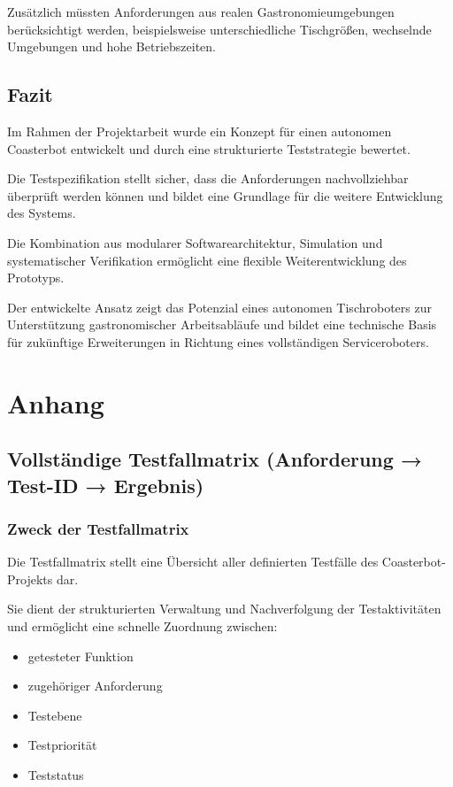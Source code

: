 Zusätzlich müssten Anforderungen aus realen Gastronomieumgebungen
berücksichtigt werden, beispielsweise unterschiedliche Tischgrößen,
wechselnde Umgebungen und hohe Betriebszeiten.

\subsection{Fazit}\label{fazit}

Im Rahmen der Projektarbeit wurde ein Konzept für einen autonomen
Coasterbot entwickelt und durch eine strukturierte Teststrategie
bewertet.

Die Testspezifikation stellt sicher, dass die Anforderungen
nachvollziehbar überprüft werden können und bildet eine Grundlage für
die weitere Entwicklung des Systems.

Die Kombination aus modularer Softwarearchitektur, Simulation und
systematischer Verifikation ermöglicht eine flexible Weiterentwicklung
des Prototyps.

Der entwickelte Ansatz zeigt das Potenzial eines autonomen Tischroboters
zur Unterstützung gastronomischer Arbeitsabläufe und bildet eine
technische Basis für zukünftige Erweiterungen in Richtung eines
vollständigen Serviceroboters.

\section{Anhang}\label{anhang}

\subsection{Vollständige Testfallmatrix (Anforderung → Test-ID →
Ergebnis)}\label{vollstuxe4ndige-testfallmatrix-anforderung-test-id-ergebnis}

\subsubsection{Zweck der Testfallmatrix}\label{zweck-der-testfallmatrix}

Die Testfallmatrix stellt eine Übersicht aller definierten Testfälle des
Coasterbot-Projekts dar.

Sie dient der strukturierten Verwaltung und Nachverfolgung der
Testaktivitäten und ermöglicht eine schnelle Zuordnung zwischen:

\begin{itemize}
\tightlist
\item
  getesteter Funktion
\item
  zugehöriger Anforderung
\item
  Testebene
\item
  Testpriorität
\item
  Teststatus
\end{itemize}

